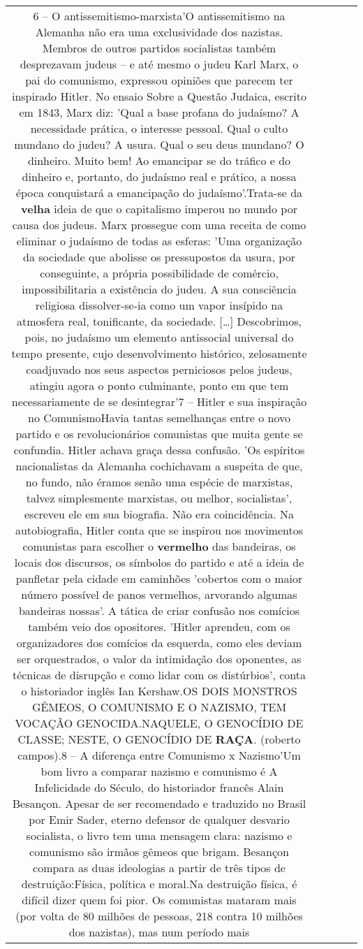 \documentclass[11pt]{article}
\newlength\mylength
\begin{document}
\begin{center}
\begin{longtable}{|C{.65\mylength}|C{.30\mylength}|C{.12\mylength}|C{.12\mylength}|C{.12\mylength}|}
  \small 6 – O antissemitismo-marxista'O antissemitismo na Alemanha não era uma exclusividade dos nazistas. Membros de outros partidos socialistas também desprezavam judeus – e até mesmo o judeu Karl Marx, o pai do comunismo, expressou opiniões que parecem ter inspirado Hitler. No ensaio Sobre a Questão Judaica, escrito em 1843, Marx diz: 'Qual a base profana do judaísmo? A necessidade prática, o interesse pessoal. Qual o culto mundano do judeu? A usura. Qual o seu deus mundano? O dinheiro. Muito bem! Ao emancipar se do tráfico e do dinheiro e, portanto, do judaísmo real e prático, a nossa época conquistará a emancipação do judaísmo'.Trata-se da \textbf{v\textbf{elha}} ideia de que o capitalismo imperou no mundo por causa dos judeus. Marx prossegue com uma receita de como eliminar o judaísmo de todas as esferas: 'Uma organização da sociedade que abolisse os pressupostos da usura, por conseguinte, a própria possibilidade de comércio, impossibilitaria a existência do judeu. A sua consciência religiosa dissolver-se-ia como um vapor insípido na atmosfera real, tonificante, da sociedade. […] Descobrimos, pois, no judaísmo um elemento antissocial universal do tempo presente, cujo desenvolvimento histórico, zelosamente coadjuvado nos seus aspectos perniciosos pelos judeus, atingiu agora o ponto culminante, ponto em que tem necessariamente de se desintegrar'7 – Hitler e sua inspiração no ComunismoHavia tantas semelhanças entre o novo partido e os revolucionários comunistas que muita gente se confundia. Hitler achava graça dessa confusão. 'Os espíritos nacionalistas da Alemanha cochichavam a suspeita de que, no fundo, não éramos senão uma espécie de marxistas, talvez simplesmente marxistas, ou melhor, socialistas', escreveu ele em sua biografia. Não era coincidência. Na autobiografia, Hitler conta que se inspirou nos movimentos comunistas para escolher o \textbf{v\textbf{ermelho}} das bandeiras, os locais dos discursos, os símbolos do partido e até a ideia de panfletar pela cidade em caminhões 'cobertos com o maior número possível de panos vermelhos, arvorando algumas bandeiras nossas'. A tática de criar confusão nos comícios também veio dos opositores. 'Hitler aprendeu, com os organizadores dos comícios da esquerda, como eles deviam ser orquestrados, o valor da intimidação dos oponentes, as técnicas de disrupção e como lidar com os distúrbios', conta o historiador inglês Ian Kershaw.OS DOIS MONSTROS GÊMEOS, O COMUNISMO E O NAZISMO, TEM VOCAÇÃO GENOCIDA.NAQUELE, O GENOCÍDIO DE CLASSE; NESTE, O GENOCÍDIO DE \textbf{RAÇA}. (roberto campos).8 –  A diferença entre Comunismo x Nazismo'Um bom livro a comparar nazismo e comunismo é A Infelicidade do Século, do historiador francês Alain Besançon. Apesar de ser recomendado e traduzido no Brasil por Emir Sader, eterno defensor de qualquer desvario socialista, o livro tem uma mensagem clara: nazismo e comunismo são irmãos gêmeos que brigam. Besançon compara as duas ideologias a partir de três tipos de destruição:Física, política e moral.Na destruição física, é difícil dizer quem foi pior. Os comunistas mataram mais (por volta de 80 milhões de pessoas, 218 contra 10 milhões dos nazistas), mas num período mais 
\end{longtable}
\end{center}
\end{document}
